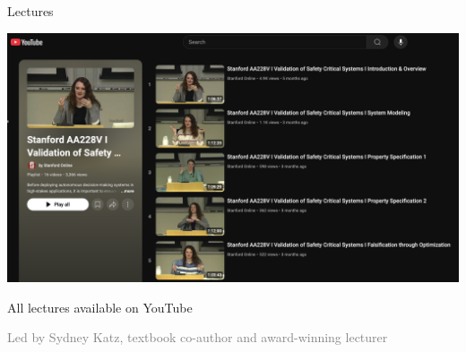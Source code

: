 \begin{frame}[fragile]{Lectures} \pause

\centering
\includegraphics[width=0.7\linewidth]{media/aa228v-lectures.png}

{\footnotesize All lectures available on YouTube}

\textcolor{gray}{\scriptsize Led by Sydney Katz, textbook co-author and award-winning lecturer}

\end{frame}
